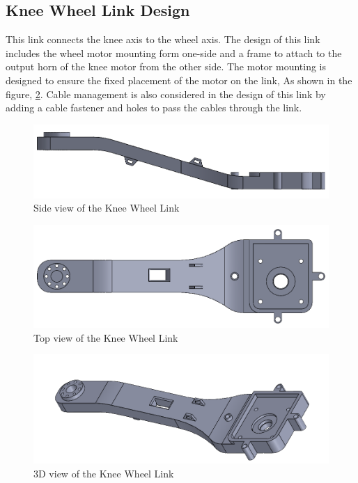 \newpage
\subsection{Knee Wheel Link Design}
This link connects the knee axis to the wheel axis.
The design of this link includes the wheel motor mounting form one-side and a frame to attach to the output horn of the knee motor from the other side. The motor mounting is designed to ensure the fixed placement of the motor on the link, As shown in the figure, \ref{fig:wheelkneelink2}. Cable management is also considered in the design of this link by adding a cable fastener and holes to pass the cables through the link.
\begin{figure}[h]
	\centering
	\includegraphics[width=1\linewidth]{Wheel_Knee_Link_1}
	\caption[Side view of the Knee Wheel Link]{Side view of the Knee Wheel Link}
	\label{fig:wheelkneelink1}
\end{figure}
\begin{figure}[h]
	\centering
	\includegraphics[width=1\linewidth]{Wheel_Knee_Link_2}
	\caption[Top view of the Knee Wheel Link]{Top view of the Knee Wheel Link}
	\label{fig:wheelkneelink2}
\end{figure}
\begin{figure}[h]
	\centering
	\includegraphics[width=1\linewidth]{Wheel_Knee_Link_3}
	\caption[3D view of the Knee Wheel Link]{3D view of the Knee Wheel Link}
	\label{fig:wheelkneelink3}
\end{figure}


